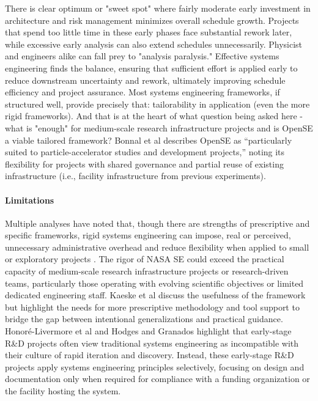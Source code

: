 There is clear optimum or "sweet spot" where fairly moderate early investment in architecture and risk management minimizes overall schedule growth. 
Projects that spend too little time in these early phases face substantial rework later, while excessive early analysis can also extend schedules unnecessarily. Physicist and engineers alike can fall prey to "analysis paralysis."
Effective systems engineering finds the balance, ensuring that sufficient effort is applied early to reduce downstream uncertainty and rework, ultimately improving schedule efficiency and project assurance.
Most systems engineering frameworks, if structured well, provide precisely that: tailorability in application (even the more rigid frameworks). 
And that is at the heart of what question being asked here - what is "enough" for medium-scale research infrastructure projects and is OpenSE a viable tailored framework? 
Bonnal et al\cite{bonnal2018opense} describes OpenSE as “particularly suited to particle-accelerator studies and development projects,” noting its flexibility for projects with shared governance and partial reuse of existing infrastructure (i.e., facility infrastructure from previous experiments).

\paragraph{Limitations}
Multiple analyses have noted that, though there are strengths of prescriptive and specific frameworks, rigid systems engineering can impose, real or perceived, unnecessary administrative overhead and reduce flexibility when applied to small or exploratory projects \cite{r&dSE} \cite{r&dSEbridge} \cite{academicsPerceptionSE}. 
The rigor of NASA SE could exceed the practical capacity of medium-scale research infrastructure projects or research-driven teams, particularly those operating with evolving scientific objectives or limited dedicated engineering staff.
Kaeske et al\cite{Kaeske_Wagner_Albers_Russenschuck_2024} discuss the usefulness of the framework but highlight the needs for more prescriptive methodology and tool support to bridge the gap between intentional generalizations and practical guidance.
Honoré-Livermore et al\cite{academicsPerceptionSE} and Hodges and Granados \cite{r&dSEbridge} highlight that early-stage R\&D projects often view traditional systems engineering as incompatible with their culture of rapid iteration and discovery. 
Instead, these early-stage R\&D projects apply systems engineering principles selectively, focusing on design and documentation only when required for compliance with a funding organization or the facility hosting the system.
